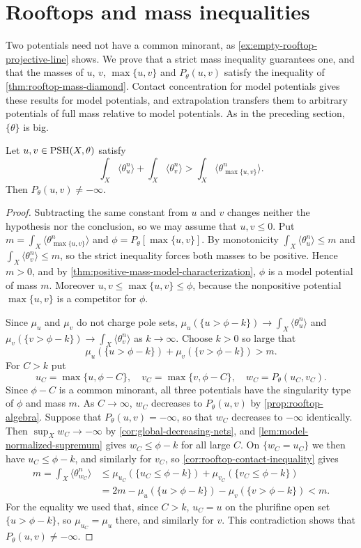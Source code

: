\section{Rooftops and mass inequalities}
\label{sec:rooftop-mass-inequalities}
Two potentials need not have a common minorant, as \cref{ex:empty-rooftop-projective-line} shows. We prove that a strict mass inequality guarantees one, and that the masses of $u$, $v$, $\max\{u,v\}$ and $P_\theta(u,v)$ satisfy the inequality of \cref{thm:rooftop-mass-diamond}. Contact concentration for model potentials gives these results for model potentials, and extrapolation transfers them to arbitrary potentials of full mass relative to model potentials. As in the preceding section, $\{\theta\}$ is big.

\begin{proposition}\label{prop:positive-mass-rooftop-existence}
Let $u,v\in\mathrm{PSH}(X,\theta)$ satisfy
\[
 \int_X\langle\theta_u^n\rangle+\int_X\langle\theta_v^n\rangle>\int_X\langle\theta_{\max\{u,v\}}^n\rangle.
\]
Then $P_\theta(u,v)\ne-\infty$.
\end{proposition}
\begin{proof}
Subtracting the same constant from $u$ and $v$ changes neither the hypothesis nor the conclusion, so we may assume that $u,v\leq0$. Put $m=\int_X\langle\theta_{\max\{u,v\}}^n\rangle$ and $\phi=P_\theta[\max\{u,v\}]$. By monotonicity $\int_X\langle\theta_u^n\rangle\leq m$ and $\int_X\langle\theta_v^n\rangle\leq m$, so the strict inequality forces both masses to be positive. Hence $m>0$, and by \cref{thm:positive-mass-model-characterization}, $\phi$ is a model potential of mass $m$. Moreover $u,v\leq\max\{u,v\}\leq\phi$, because the nonpositive potential $\max\{u,v\}$ is a competitor for $\phi$.

Since $\mu_u$ and $\mu_v$ do not charge pole sets, $\mu_u(\{u>\phi-k\})\to\int_X\langle\theta_u^n\rangle$ and $\mu_v(\{v>\phi-k\})\to\int_X\langle\theta_v^n\rangle$ as $k\to\infty$. Choose $k>0$ so large that
\[
 \mu_u(\{u>\phi-k\})+\mu_v(\{v>\phi-k\})>m.
\]
For $C>k$ put
\[
 u_C=\max\{u,\phi-C\},\quad
 v_C=\max\{v,\phi-C\},\quad
 w_C=P_\theta(u_C,v_C).
\]
Since $\phi-C$ is a common minorant, all three potentials have the singularity type of $\phi$ and mass $m$. As $C\to\infty$, $w_C$ decreases to $P_\theta(u,v)$ by \cref{prop:rooftop-algebra}. Suppose that $P_\theta(u,v)=-\infty$, so that $w_C$ decreases to $-\infty$ identically. Then $\sup_Xw_C\to-\infty$ by \cref{cor:global-decreasing-nets}, and \cref{lem:model-normalized-supremum} gives $w_C\leq\phi-k$ for all large $C$. On $\{w_C=u_C\}$ we then have $u_C\leq\phi-k$, and similarly for $v_C$, so \cref{cor:rooftop-contact-inequality} gives
\[
 \begin{split}
 m=\int_X\langle\theta_{w_C}^n\rangle&\leq\mu_{u_C}(\{u_C\leq\phi-k\})
                +\mu_{v_C}(\{v_C\leq\phi-k\})\\
  &=2m-\mu_u(\{u>\phi-k\})-\mu_v(\{v>\phi-k\})<m.
 \end{split}
\]
For the equality we used that, since $C>k$, $u_C=u$ on the plurifine open set $\{u>\phi-k\}$, so $\mu_{u_C}=\mu_u$ there, and similarly for $v$. This contradiction shows that $P_\theta(u,v)\ne-\infty$.
\end{proof}
